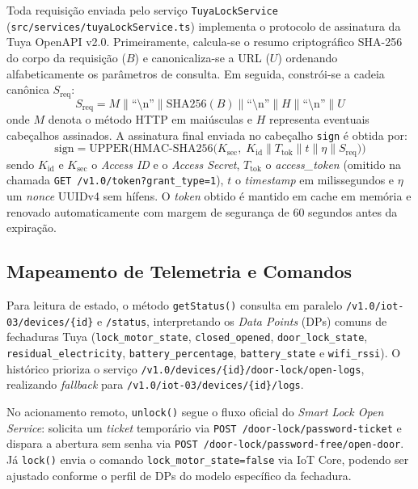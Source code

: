 \documentclass[10pt,twocolumn,a4paper]{article}
\begin{document}
Toda requisi\c{c}\~ao enviada pelo servi\c{c}o \texttt{TuyaLockService} (\texttt{src/services/tuyaLockService.ts}) implementa o protocolo de assinatura da Tuya OpenAPI v2.0. Primeiramente, calcula-se o resumo criptogr\'afico SHA-256 do corpo da requisi\c{c}\~ao ($B$) e canonicaliza-se a URL ($U$) ordenando alfabeticamente os par\^ametros de consulta. Em seguida, constr\'oi-se a cadeia can\^onica $S_{\text{req}}$:
\begin{equation}
  S_{\text{req}} = M \parallel \text{``\textbackslash n''} \parallel \text{SHA256}(B) \parallel \text{``\textbackslash n''} \parallel H \parallel \text{``\textbackslash n''} \parallel U
\end{equation}
onde $M$ denota o m\'etodo HTTP em mai\'usculas e $H$ representa eventuais cabe\c{c}alhos assinados. A assinatura final enviada no cabe\c{c}alho \texttt{sign} \'e obtida por:
\begin{equation}
  \text{sign} = \text{UPPER}\Big(\text{HMAC-SHA256}\big(K_{\text{sec}}, \; K_{\text{id}} \parallel T_{\text{tok}} \parallel t \parallel \eta \parallel S_{\text{req}}\big)\Big)
\end{equation}
sendo $K_{\text{id}}$ e $K_{\text{sec}}$ o \textit{Access ID} e o \textit{Access Secret}, $T_{\text{tok}}$ o \textit{access\_token} (omitido na chamada \texttt{GET /v1.0/token?grant\_type=1}), $t$ o \textit{timestamp} em milissegundos e $\eta$ um \textit{nonce} UUIDv4 sem h\'ifens. O \textit{token} obtido \'e mantido em cache em mem\'oria e renovado automaticamente com margem de seguran\c{c}a de 60 segundos antes da expira\c{c}\~ao.

\subsection{Mapeamento de Telemetria e Comandos}

Para leitura de estado, o m\'etodo \texttt{getStatus()} consulta em paralelo \texttt{/v1.0/iot-03/devices/\{id\}} e \texttt{/status}, interpretando os \textit{Data Points} (DPs) comuns de fechaduras Tuya (\texttt{lock\_motor\_state}, \texttt{closed\_opened}, \texttt{door\_lock\_state}, \texttt{residual\_electricity}, \texttt{battery\_percentage}, \texttt{battery\_state} e \texttt{wifi\_rssi}). O hist\'orico prioriza o servi\c{c}o \texttt{/v1.0/devices/\{id\}/door-lock/open-logs}, realizando \textit{fallback} para \texttt{/v1.0/iot-03/devices/\{id\}/logs}.

No acionamento remoto, \texttt{unlock()} segue o fluxo oficial do \textit{Smart Lock Open Service}: solicita um \textit{ticket} tempor\'ario via \texttt{POST /door-lock/password-ticket} e dispara a abertura sem senha via \texttt{POST /door-lock/password-free/open-door}. J\'a \texttt{lock()} envia o comando \texttt{lock\_motor\_state=false} via IoT Core, podendo ser ajustado conforme o perfil de DPs do modelo espec\'ifico da fechadura.
\end{document}
